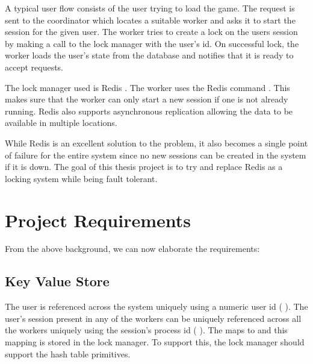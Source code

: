 A typical user flow consists of the user trying to load the game. The request
is sent to the coordinator which locates a suitable worker and asks it to
start the session for the given user. The worker tries to create a lock on
the users session by making a call to the lock manager with the user's id.
On successful lock, the worker loads the user's state from the database and
notifies that it is ready to accept requests.

The lock manager used is Redis \citep{redis}%
. The worker uses the Redis command %
. This makes sure that the worker can only start a new session if one is
not already running. Redis also supports asynchronous replication allowing the
data to be available in multiple locations.

While Redis is an excellent solution to the problem, it also becomes a single
point of failure for the entire system since no new sessions can be created in
the system if it is down. The goal of this thesis project is to try and replace
Redis as a locking system while being fault tolerant.

\section{Project Requirements}

From the above background, we can now elaborate the requirements:

\subsection{Key Value Store}
\label{section:ml.kv.store}


The user is referenced across the system uniquely using a numeric user id
(%
). The user's session present in any of the workers can be uniquely
referenced across all the workers uniquely using the session's process id
(%
).
The  maps to  and this mapping is stored in the lock
manager. To support this, the lock manager should support the hash
table primitives.

